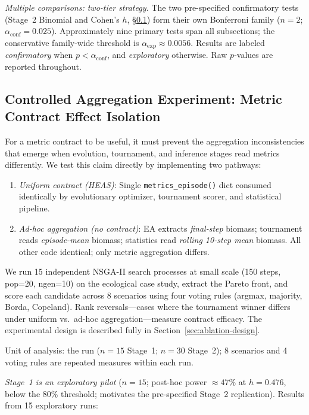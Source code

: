 \documentclass{wscpaperproc}
\begin{document}
\emph{Multiple comparisons: two-tier strategy.} The two pre-specified
confirmatory tests (Stage~2 Binomial and Cohen's $h$, \S\ref{sec:controlled-agg})
form their own Bonferroni family ($n\!=\!2$;
$\alpha_{\text{conf}}\!=\!0.025$). Approximately nine primary tests span all
subsections; the conservative family-wide threshold is
$\alpha_{\text{exp}}\!\approx\!0.0056$. Results are labeled
\emph{confirmatory} when $p\!<\!\alpha_{\text{conf}}$, and \emph{exploratory}
otherwise. Raw $p$-values are reported throughout.

\subsection{Controlled Aggregation Experiment: Metric Contract Effect Isolation}
\label{sec:controlled-agg}

For a metric contract to be useful, it must prevent the aggregation inconsistencies
that emerge when evolution, tournament, and inference stages read metrics differently.
We test this claim directly by implementing two pathways:

\begin{enumerate}
\item \emph{Uniform contract (HEAS)}: Single \texttt{metrics\_episode()} dict consumed
identically by evolutionary optimizer, tournament scorer, and statistical pipeline.
\item \emph{Ad-hoc aggregation (no contract)}: EA extracts \emph{final-step} biomass;
tournament reads \emph{episode-mean} biomass; statistics read \emph{rolling 10-step mean}
biomass. All other code identical; only metric aggregation differs.
\end{enumerate}

We run 15 independent NSGA-II search processes at small scale (150 steps, pop=20,
ngen=10) on the ecological case study, extract the Pareto front, and score each
candidate across 8 scenarios using four voting rules (argmax, majority, Borda,
Copeland). Rank reversals---cases where the tournament winner differs under uniform
vs.\ ad-hoc aggregation---measure contract efficacy. The experimental design is
described fully in Section~\ref{sec:ablation-design}.

Unit of analysis: the run ($n\!=\!15$ Stage~1; $n\!=\!30$ Stage~2); 8 scenarios and 4 voting rules are repeated measures within each run.

\emph{Stage~1 is an exploratory pilot} ($n\!=\!15$; post-hoc power
$\approx\!47\%$ at $h\!=\!0.476$, below the 80\% threshold; motivates the
pre-specified Stage~2 replication). Results from 15 exploratory runs:
\end{document}
